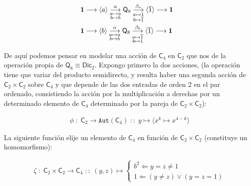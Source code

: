 \documentclass[12pt,a4paper,fleqn,spanish,final,openright]{extbook}
\theoremstyle{definition}
\theoremstyle{remark}
\begin{document}
\begin{center}
\begin{align*}
& \bold{1} 
\longrightarrow 
\langle a \rangle 
\underset{{\substack{{a\mapsto a}\\{b\mapsto b}}}}{\overset{\alpha }{\longrightarrow}}
\mathsf{Q}_{8} 
\underset{{\substack{{a\mapsto 1}\\{b\mapsto \overline{1}}}}}{\overset{\beta_a }{\longrightarrow}}
\langle \overline{1} \rangle 
\longrightarrow 
\bold{1}\\
& \bold{1} 
\longrightarrow 
\langle b \rangle 
\underset{{\substack{{a\mapsto a}\\{b\mapsto b}}}}{\overset{\alpha }{\longrightarrow}}
\mathsf{Q}_{8} 
\underset{{\substack{{a\mapsto \overline{1}}\\{b\mapsto 1}}}}{\overset{\beta_b }{\longrightarrow}}
\langle \overline{1} \rangle 
\longrightarrow 
\bold{1} 
\end{align*}
\end{center}    


	De aquí podemos pensar en modelar una acción de $\mathsf{C}_{4}$ en $\mathsf{C}_{2}$ que nos de la operación propia de $\mathsf{Q}_{8}\equiv\mathsf{Dic}_{2}$. Expongo primero la dos acciones, (la operación tiene que variar del producto semidirecto, y resulta haber una segunda acción de $\mathsf{C}_{2} \times \mathsf{C}_{2}$ sobre $\mathsf{C}_{4}$ y que depende de las dos entradas de orden $2$ en el par ordenado, consistiendo la acción por la multiplicación a derechas por un determinado elemento de $\mathsf{C}_{4}$ determinado por la pareja de ${\mathsf{C}_{2}}{\times}{\mathsf{C}_{2}}$): 

\begin{align*}
&\phi \;:\;\mathsf{C}_{2} \longrightarrow \mathtt{Aut}⁡\left(\mathsf{C}_{4}\right)\; ::\; y \mapsto \langle x^k\mapsto x^{4-k}\rangle
\end{align*}
	
	La siguiente función elije un elemento de $\mathsf{C}_{4}$ en función de $\mathsf{C}_{2}\times\mathsf{C}_{2}$ (constituye un homomorfismo): 

\begin{align*}
&\zeta \;:\; 
{{{\mathsf{C}}_{2}}{\times}{{\mathsf{C}}_{2}}}
\longrightarrow
{{\mathsf{C}}_{4}}\;::\;\left(y,z\right) \mapsto
\begin{cases}
b^2 \Leftarrow {y=z\neq 1}\\
1 \Leftarrow (y\neq z)\vee(y=z=1)
\end{cases}
\end{align*}
\end{document}
